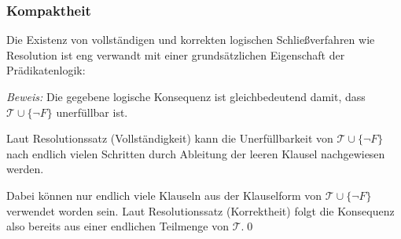 \documentclass[aspectratio=1610,onlymath]{beamer}
\begin{document}
\begin{frame}\frametitle{Kompaktheit}

Die Existenz von vollständigen und korrekten logischen Schließverfahren wie Resolution
ist eng verwandt mit einer grundsätzlichen Eigenschaft der Prädikatenlogik:\bigskip

\pause

\small
\emph{Beweis:} Die gegebene logische Konsequenz ist gleichbedeutend damit, dass
$\mathcal{T}\cup\{\neg F\}$ unerfüllbar ist.\medskip

Laut Resolutionssatz (Vollständigkeit) kann die Unerfüllbarkeit von $\mathcal{T}\cup\{\neg F\}$ nach endlich vielen Schritten durch Ableitung der leeren Klausel nachgewiesen werden.\medskip

Dabei können nur endlich viele Klauseln aus der Klauselform von $\mathcal{T}\cup\{\neg F\}$ verwendet worden sein. Laut Resolutionssatz (Korrektheit) folgt die Konsequenz also bereits aus einer endlichen Teilmenge von $\mathcal{T}$.\qed

\end{frame}
% 
% 
% 
% 
% 
% 
% 
\end{document}
